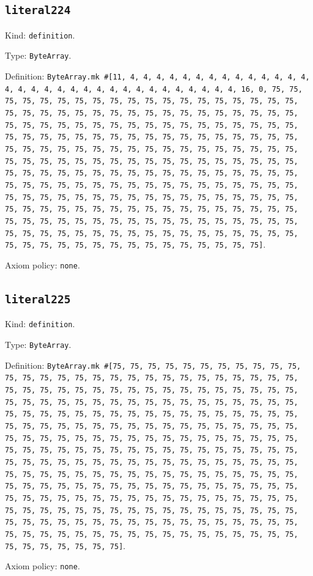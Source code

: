 \documentclass[11pt]{article}
\begin{document}
\subsection*{\texttt{literal224}}
\noindent Kind: \texttt{definition}.\par
\noindent Type: \texttt{ByteArray}.\par
\noindent Definition: \texttt{ByteArray.mk \#[11, 4, 4, 4, 4, 4, 4, 4, 4, 4, 4, 4, 4, 4, 4, 4, 4, 4, 4, 4, 4, 4, 4, 4, 4, 4, 4, 4, 4, 4, 4, 4, 4, 16, 0, 75, 75, 75, 75, 75, 75, 75, 75, 75, 75, 75, 75, 75, 75, 75, 75, 75, 75, 75, 75, 75, 75, 75, 75, 75, 75, 75, 75, 75, 75, 75, 75, 75, 75, 75, 75, 75, 75, 75, 75, 75, 75, 75, 75, 75, 75, 75, 75, 75, 75, 75, 75, 75, 75, 75, 75, 75, 75, 75, 75, 75, 75, 75, 75, 75, 75, 75, 75, 75, 75, 75, 75, 75, 75, 75, 75, 75, 75, 75, 75, 75, 75, 75, 75, 75, 75, 75, 75, 75, 75, 75, 75, 75, 75, 75, 75, 75, 75, 75, 75, 75, 75, 75, 75, 75, 75, 75, 75, 75, 75, 75, 75, 75, 75, 75, 75, 75, 75, 75, 75, 75, 75, 75, 75, 75, 75, 75, 75, 75, 75, 75, 75, 75, 75, 75, 75, 75, 75, 75, 75, 75, 75, 75, 75, 75, 75, 75, 75, 75, 75, 75, 75, 75, 75, 75, 75, 75, 75, 75, 75, 75, 75, 75, 75, 75, 75, 75, 75, 75, 75, 75, 75, 75, 75, 75, 75, 75, 75, 75, 75, 75, 75, 75, 75, 75, 75, 75, 75, 75, 75, 75, 75, 75, 75, 75, 75, 75, 75, 75, 75, 75, 75, 75, 75, 75, 75, 75, 75, 75, 75, 75, 75, 75, 75, 75, 75, 75, 75, 75, 75, 75]}.\par
\noindent Axiom policy: \texttt{none}.\par
\subsection*{\texttt{literal225}}
\noindent Kind: \texttt{definition}.\par
\noindent Type: \texttt{ByteArray}.\par
\noindent Definition: \texttt{ByteArray.mk \#[75, 75, 75, 75, 75, 75, 75, 75, 75, 75, 75, 75, 75, 75, 75, 75, 75, 75, 75, 75, 75, 75, 75, 75, 75, 75, 75, 75, 75, 75, 75, 75, 75, 75, 75, 75, 75, 75, 75, 75, 75, 75, 75, 75, 75, 75, 75, 75, 75, 75, 75, 75, 75, 75, 75, 75, 75, 75, 75, 75, 75, 75, 75, 75, 75, 75, 75, 75, 75, 75, 75, 75, 75, 75, 75, 75, 75, 75, 75, 75, 75, 75, 75, 75, 75, 75, 75, 75, 75, 75, 75, 75, 75, 75, 75, 75, 75, 75, 75, 75, 75, 75, 75, 75, 75, 75, 75, 75, 75, 75, 75, 75, 75, 75, 75, 75, 75, 75, 75, 75, 75, 75, 75, 75, 75, 75, 75, 75, 75, 75, 75, 75, 75, 75, 75, 75, 75, 75, 75, 75, 75, 75, 75, 75, 75, 75, 75, 75, 75, 75, 75, 75, 75, 75, 75, 75, 75, 75, 75, 75, 75, 75, 75, 75, 75, 75, 75, 75, 75, 75, 75, 75, 75, 75, 75, 75, 75, 75, 75, 75, 75, 75, 75, 75, 75, 75, 75, 75, 75, 75, 75, 75, 75, 75, 75, 75, 75, 75, 75, 75, 75, 75, 75, 75, 75, 75, 75, 75, 75, 75, 75, 75, 75, 75, 75, 75, 75, 75, 75, 75, 75, 75, 75, 75, 75, 75, 75, 75, 75, 75, 75, 75, 75, 75, 75, 75, 75, 75, 75, 75, 75, 75, 75, 75, 75, 75, 75, 75, 75, 75, 75, 75, 75, 75, 75, 75]}.\par
\noindent Axiom policy: \texttt{none}.\par
\end{document}
